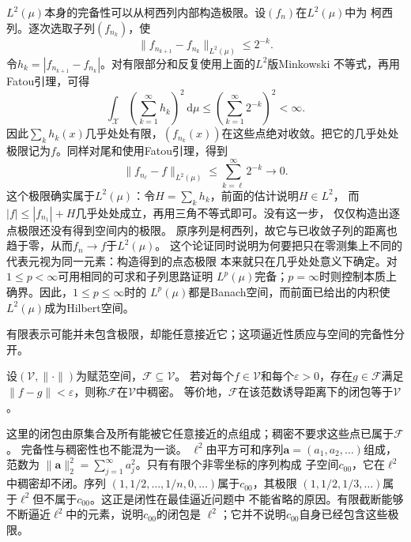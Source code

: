 $L^2(\mu)$本身的完备性可以从柯西列内部构造极限。设$(f_n)$在$L^2(\mu)$中为
柯西列。逐次选取子列$(f_{n_k})$，使
\[
  \lVert f_{n_{k+1}}-f_{n_k}\rVert_{L^2(\mu)}
  \leq 2^{-k}.
\]
令$h_k=|f_{n_{k+1}}-f_{n_k}|$。对有限部分和反复使用上面的$L^2$版Minkowski
不等式，再用Fatou引理，可得
\[
  \int_{\mathcal{X}}
  \left(\sum_{k=1}^{\infty}h_k\right)^2
  \,\mathrm{d}\mu
  \leq
  \left(\sum_{k=1}^{\infty}2^{-k}\right)^2
  <\infty.
\]
因此$\sum_k h_k(x)$几乎处处有限，$(f_{n_k}(x))$在这些点绝对收敛。把它的几乎处处
极限记为$f$。同样对尾和使用Fatou引理，得到
\[
  \lVert f_{n_\ell}-f\rVert_{L^2(\mu)}
  \leq
  \sum_{k=\ell}^{\infty}2^{-k}
  \longrightarrow0.
\]
这个极限确实属于$L^2(\mu)$：令$H=\sum_k h_k$，前面的估计说明$H\in L^2$，
而$|f|\leq |f_{n_1}|+H$几乎处处成立，再用三角不等式即可。没有这一步，
仅仅构造出逐点极限还没有得到空间内的极限。
原序列是柯西列，故它与已收敛子列的距离也趋于零，从而$f_n\to f$于$L^2(\mu)$。
这个论证同时说明为何要把只在零测集上不同的代表元视为同一元素：构造得到的点态极限
本来就只在几乎处处意义下确定。对$1\leq p<\infty$可用相同的可求和子列思路证明
$L^p(\mu)$完备；$p=\infty$时则控制本质上确界。因此，$1\leq p\leq\infty$时的
$L^p(\mu)$都是Banach空间，而前面已给出的内积使$L^2(\mu)$成为Hilbert空间。

有限表示可能并未包含极限，却能任意接近它；这项逼近性质应与空间的完备性分开。
\begin{definition}[稠密子集]
\label{def:functional-density}
设$(\mathcal V,\lVert\cdot\rVert)$为赋范空间，$\mathcal F\subseteq\mathcal V$。
若对每个$f\in\mathcal V$和每个$\varepsilon>0$，存在$g\in\mathcal F$满足
$\lVert f-g\rVert<\varepsilon$，则称$\mathcal F$在$\mathcal V$中稠密。
等价地，$\mathcal F$在该范数诱导距离下的闭包等于$\mathcal V$。
\end{definition}
这里的闭包由原集合及所有能被它任意接近的点组成；稠密不要求这些点已属于$\mathcal F$。
完备性与稠密性也不能混为一谈。
$\ell^2$由平方可和序列$\bm{a}=(a_1,a_2,\ldots)$组成，范数为
$\lVert\bm{a}\rVert_2^2=\sum_{j=1}^{\infty}a_j^2$。只有有限个非零坐标的序列构成
子空间$c_{00}$，它在$\ell^2$中稠密却不闭。序列
$(1,1/2,\ldots,1/n,0,\ldots)$属于$c_{00}$，其极限
$(1,1/2,1/3,\ldots)$属于$\ell^2$但不属于$c_{00}$。这正是闭性在最佳逼近问题中
不能省略的原因。有限截断能够不断逼近$\ell^2$中的元素，说明$c_{00}$的闭包是
$\ell^2$；它并不说明$c_{00}$自身已经包含这些极限。

